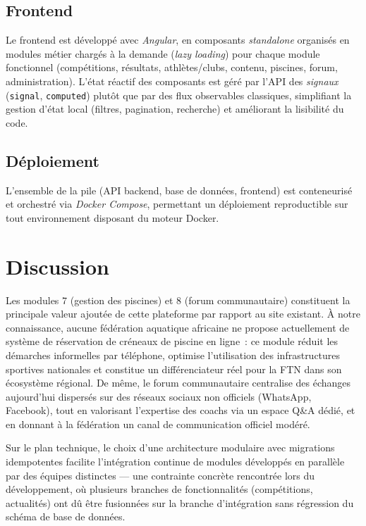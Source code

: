 \documentclass[conference]{IEEEtran}
\begin{document}
\subsection{Frontend}
Le frontend est développé avec \emph{Angular}, en composants \emph{standalone} organisés en modules métier chargés à la demande (\emph{lazy loading}) pour chaque module fonctionnel (compétitions, résultats, athlètes/clubs, contenu, piscines, forum, administration). L'état réactif des composants est géré par l'API des \emph{signaux} (\texttt{signal}, \texttt{computed}) plutôt que par des flux observables classiques, simplifiant la gestion d'état local (filtres, pagination, recherche) et améliorant la lisibilité du code.

\subsection{Déploiement}
L'ensemble de la pile (API backend, base de données, frontend) est conteneurisé et orchestré via \emph{Docker Compose}, permettant un déploiement reproductible sur tout environnement disposant du moteur Docker.

\section{Discussion}
Les modules 7 (gestion des piscines) et 8 (forum communautaire) constituent la principale valeur ajoutée de cette plateforme par rapport au site existant. À notre connaissance, aucune fédération aquatique africaine ne propose actuellement de système de réservation de créneaux de piscine en ligne~: ce module réduit les démarches informelles par téléphone, optimise l'utilisation des infrastructures sportives nationales et constitue un différenciateur réel pour la FTN dans son écosystème régional. De même, le forum communautaire centralise des échanges aujourd'hui dispersés sur des réseaux sociaux non officiels (WhatsApp, Facebook), tout en valorisant l'expertise des coachs via un espace Q\&A dédié, et en donnant à la fédération un canal de communication officiel modéré.

Sur le plan technique, le choix d'une architecture modulaire avec migrations idempotentes facilite l'intégration continue de modules développés en parallèle par des équipes distinctes — une contrainte concrète rencontrée lors du développement, où plusieurs branches de fonctionnalités (compétitions, actualités) ont dû être fusionnées sur la branche d'intégration sans régression du schéma de base de données.
\end{document}
